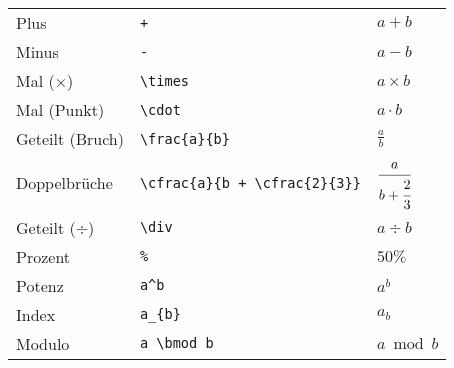 \begin{longtable}{l l l}
    \midrule
    Plus                      & \texttt{+}                                                                              & $ a + b $                            \\
    Minus                     & \texttt{-}                                                                              & $ a - b $                            \\
    Mal (×)                   & \texttt{\textbackslash times}                                                           & $ a \times b $                       \\
    Mal (Punkt)               & \texttt{\textbackslash cdot}                                                            & $ a \cdot b $                        \\
    Geteilt (Bruch)           & \texttt{\textbackslash frac\{a\}\{b\}}                                                  & $ \frac{a}{b} $                      \\
    Doppelbrüche              & \texttt{\textbackslash cfrac\{a\}\{b + \textbackslash cfrac\{2\}\{3\}\}}                & $ \cfrac{a}{b + \cfrac{2}{3}} $      \\
    Geteilt (÷)               & \texttt{\textbackslash div}                                                             & $ a \div b $                         \\
    Prozent                   & \texttt{\%}                                                                             & $ 50\% $                             \\
    Potenz                    & \texttt{a\^{}b}                                                                         & $ a^b $                              \\
    Index                     & \texttt{a\_\{b\}}                                                                       & $ a_b $                              \\
    Modulo                    & \texttt{a \textbackslash bmod b}                                                        & $ a \bmod b $                        \\


\end{longtable}

